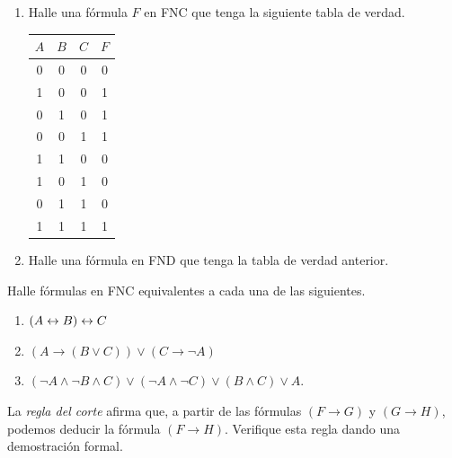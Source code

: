 \message{ !name(main.tex)}\documentclass[12pt,a4paper]{book}
\begin{document}
    \begin{ejercicio}
        \begin{enumerate}[label=(\alph*)]
            \item Halle una fórmula $F$ en FNC que tenga la siguiente tabla de verdad.
            \begin{center}
            \renewcommand{\arraystretch}{1.4}
            \begin{tabular}{c | c | c | c}
                $A$ & $B$ & $C$ & $F$\\
                \hline
                0 & 0 & 0 & 0\\
                1 & 0 & 0 & 1\\
                0 & 1 & 0 & 1\\
                0 & 0 & 1 & 1\\
                1 & 1 & 0 & 0\\
                1 & 0 & 1 & 0\\
                0 & 1 & 1 & 0\\
                1 & 1 & 1 & 1\\
            \end{tabular}
            \end{center}
            \item Halle una fórmula en FND que tenga la tabla de verdad anterior.
        \end{enumerate}
    \end{ejercicio}

    \begin{ejercicio}
        Halle fórmulas en FNC equivalentes a cada una de las siguientes.
        \begin{enumerate}[label=(\alph*)]
            \item $(A\leftrightarrow B)\leftrightarrow C$
            \item $(A\rightarrow(B\vee C))\vee(C\rightarrow\neg A)$
            \item $(\neg A\wedge\neg B\wedge C)\vee(\neg A\wedge\neg C)\vee(B\wedge C)\vee A$.
        \end{enumerate}
    \end{ejercicio}

    \begin{ejercicio}
        La \textit{regla del corte} afirma que, a partir de las fórmulas $(F\rightarrow G)$ y $(G\rightarrow H)$, podemos
        deducir la fórmula $(F\rightarrow H)$. Verifique esta regla dando una demostración formal.
    \end{ejercicio}
\end{document}
